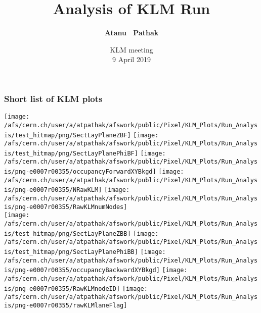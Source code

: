 \documentclass{beamer}
\title{Analysis of KLM Run} %
\author{{\bf Atanu ~Pathak} \\}
\institute{\begin{minipage}{0.5\textwidth}\centering
\texttt{[image: /afs/cern.ch/user/s/swaban/public/university-of-louisville-logo.png]}
\end{minipage}}
\date {{KLM meeting}\\9 April 2019}
\begin{document}
\begin{frame}
\frametitle{Short list of KLM plots}
\vspace*{.05cm}
\begin{center}
\begin{normalsize}

\vspace*{-.2cm}
\begin{center}

\texttt{[image: /afs/cern.ch/user/a/atpathak/afswork/public/Pixel/KLM\_Plots/Run\_Analysis/test\_hitmap/png/SectLayPlaneZBF]}
\texttt{[image: /afs/cern.ch/user/a/atpathak/afswork/public/Pixel/KLM\_Plots/Run\_Analysis/test\_hitmap/png/SectLayPlanePhiBF]}
\texttt{[image: /afs/cern.ch/user/a/atpathak/afswork/public/Pixel/KLM\_Plots/Run\_Analysis/png-e0007r00355/occupancyForwardXYBkgd]}
\texttt{[image: /afs/cern.ch/user/a/atpathak/afswork/public/Pixel/KLM\_Plots/Run\_Analysis/png-e0007r00355/NRawKLM]}
\texttt{[image: /afs/cern.ch/user/a/atpathak/afswork/public/Pixel/KLM\_Plots/Run\_Analysis/png-e0007r00355/RawKLMnumNodes]}\\
\texttt{[image: /afs/cern.ch/user/a/atpathak/afswork/public/Pixel/KLM\_Plots/Run\_Analysis/test\_hitmap/png/SectLayPlaneZBB]}
\texttt{[image: /afs/cern.ch/user/a/atpathak/afswork/public/Pixel/KLM\_Plots/Run\_Analysis/test\_hitmap/png/SectLayPlanePhiBB]}
\texttt{[image: /afs/cern.ch/user/a/atpathak/afswork/public/Pixel/KLM\_Plots/Run\_Analysis/png-e0007r00355/occupancyBackwardXYBkgd]}
\texttt{[image: /afs/cern.ch/user/a/atpathak/afswork/public/Pixel/KLM\_Plots/Run\_Analysis/png-e0007r00355/RawKLMnodeID]}
\texttt{[image: /afs/cern.ch/user/a/atpathak/afswork/public/Pixel/KLM\_Plots/Run\_Analysis/png-e0007r00355/rawKLMlaneFlag]} \\

\end{center}
\end{normalsize}
\end{center}
\end{frame}
\end{document}
